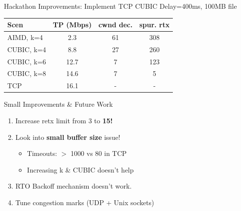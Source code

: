\begin{frame}[fragile]{Hackathon Improvements: Implement TCP CUBIC }
Delay=400ms, 100MB file

\begin{tabular}{lccc}
\toprule
\textbf{Scen} & \textbf{TP (Mbps)} & \textbf{cwnd dec.} & \textbf{spur. rtx} \\ 
\midrule
AIMD, k=4 &   2.3 & 61 & 308  \\
CUBIC, k=4 &  8.8 & 27 & 260  \\
CUBIC, k=6 & 12.7 & 7 & 123  \\
CUBIC, k=8 & 14.6 & 7 & 5  \\
TCP 		  &  16.1 & - & -\\

\bottomrule
\end{tabular}

\end{frame}


\begin{frame}[fragile]{Small Improvements \& Future Work}

\begin{enumerate}
\item Increase retx limit from 3 to \textbf{15!}

\pause
\item Look into \textbf{small buffer size} issue! 
\begin{itemize}
\item Timeouts: $>$ 1000 vs 80 in TCP
\item Increasing k \& CUBIC doesn't help
\end{itemize}

\pause
\item RTO Backoff mechanism doesn't work.

\pause
\item Tune congestion marks (UDP + Unix sockets)
\end{enumerate}

\end{frame}




